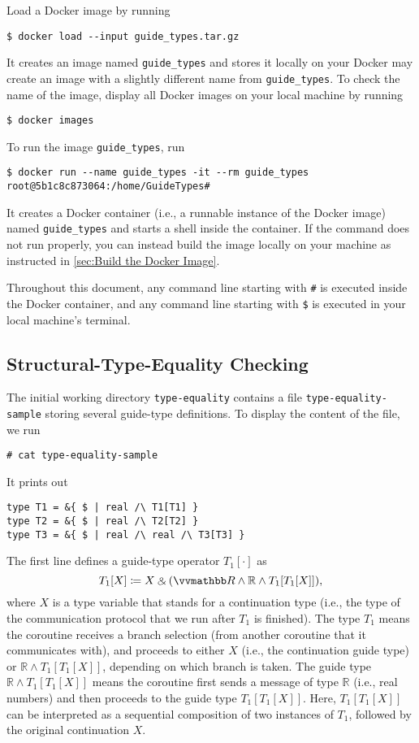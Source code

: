 Load a Docker image by running
\begin{verbatim}
$ docker load --input guide_types.tar.gz
\end{verbatim}
%
It creates an image named \texttt{guide\_types} and stores it locally on your
%
Docker may create an image with a slightly different name from
\texttt{guide\_types}.
%
To check the name of the image, display all Docker images on your local machine
by running
\begin{verbatim}
$ docker images
\end{verbatim}

To run the image \texttt{guide\_types}, run
\begin{verbatim}
$ docker run --name guide_types -it --rm guide_types
root@5b1c8c873064:/home/GuideTypes#
\end{verbatim}
%
It creates a Docker container (i.e., a runnable instance of the Docker image)
named \texttt{guide\_types} and starts a shell inside the container.
%
If the command does not run properly, you can instead build the image locally on
your machine as instructed in \cref{sec:Build the Docker Image}.

Throughout this document, any command line starting with \texttt{\#} is executed
inside the Docker container, and any command line starting with \texttt{\$} is
executed in your local machine's terminal.

\subsection{Structural-Type-Equality Checking}

The initial working directory \texttt{type-equality} contains a file
\texttt{type-equality-sample} storing several guide-type definitions.
%
To display the content of the file, we run
\begin{verbatim}
# cat type-equality-sample
\end{verbatim}
%
It prints out
\begin{verbatim}
type T1 = &{ $ | real /\ T1[T1] }
type T2 = &{ $ | real /\ T2[T2] }
type T3 = &{ $ | real /\ real /\ T3[T3] }
\end{verbatim}
%
The first line defines a guide-type operator $T_1 [\cdot]$ as
\begin{equation*}
  T_1 [X] \coloneq X \echoice (\treal \land \mathbb{R} \land T_1 [T_1[X]]),
\end{equation*}
where $X$ is a type variable that stands for a continuation type (i.e., the type
of the communication protocol that we run after $T_1$ is finished).
%
The type $T_1$ means the coroutine receives a branch selection (from another
coroutine that it communicates with), and proceeds to either $X$ (i.e., the
continuation guide type) or $\mathbb{R} \land T_1 [T_1[X]]$, depending on which
branch is taken.
%
The guide type $\mathbb{R} \land T_1 [T_1[X]]$ means the coroutine first sends a
message of type $\mathbb{R}$ (i.e., real numbers) and then proceeds to the guide type
$T_1 [T_1 [X]]$.
%
Here, $T_1 [T_1 [X]]$ can be interpreted as a sequential composition of two
instances of $T_1$, followed by the original continuation $X$.

